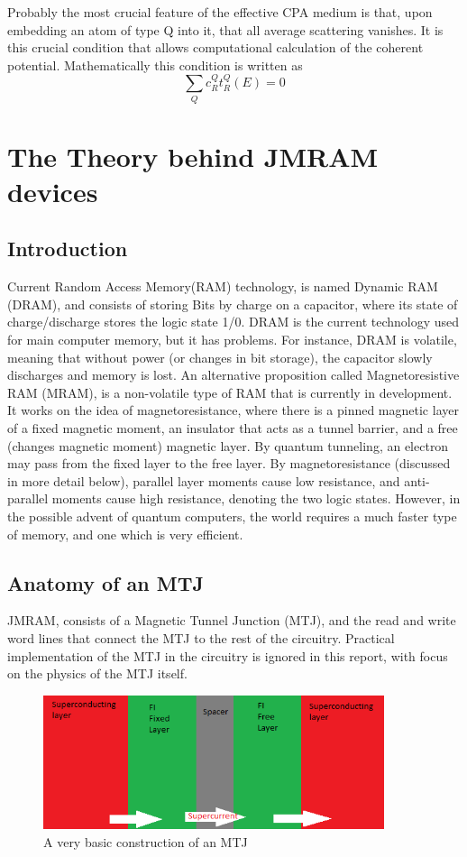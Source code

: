\documentclass[12pt]{article}
\begin{document}
Probably the most crucial feature of the effective CPA medium is that, upon embedding an atom of type Q into it, that all average scattering vanishes. It is this crucial condition that allows computational calculation of the coherent potential. Mathematically this condition is written as \cite{turek}
$$\sum_Qc_R^Qt_R^Q(E)=0$$

\section{The Theory behind JMRAM devices}
\subsection{Introduction}

Current Random Access Memory(RAM) technology, is named Dynamic RAM (DRAM), and consists of storing Bits by charge on a capacitor, where its state of charge/discharge stores the logic state 1/0. DRAM is the current technology used for main computer memory, but it has problems. For instance, DRAM is volatile, meaning that without power (or changes in bit storage), the capacitor slowly discharges and memory is lost. An alternative proposition called Magnetoresistive RAM (MRAM), is a non-volatile type of RAM that is currently in development. It works on the idea of magnetoresistance, where there is a pinned magnetic layer of a fixed magnetic moment, an insulator that acts as a tunnel barrier, and a free (changes magnetic moment) magnetic layer. By quantum tunneling, an electron may pass from the fixed layer to the free layer. By magnetoresistance (discussed in more detail below), parallel layer moments cause low resistance, and anti-parallel moments cause high resistance, denoting the two logic states. However, in the possible advent of quantum computers, the world requires a much faster type of memory, and one which is very efficient.

\subsection{Anatomy of an MTJ}

JMRAM, consists of a Magnetic Tunnel Junction (MTJ), and the read and write word lines that connect the MTJ to the rest of the circuitry. Practical implementation of the MTJ in the circuitry is ignored in this report, with focus on the physics of the MTJ itself.
 
\begin{figure}[htp]
    \centering
    \begin{measuredfigure}
    \includegraphics[width=10cm]{mtj}
    \caption{A very basic construction of an MTJ}
    \end{measuredfigure}
    \end{figure} 
    
\end{document}
